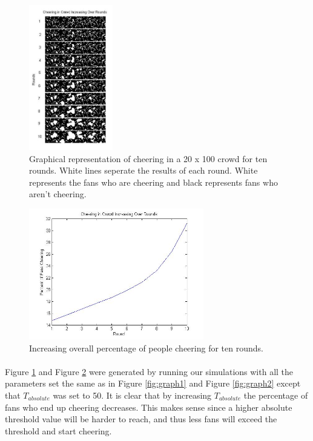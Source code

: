 \documentclass[oneside,12pt]{report}
\begin{document}
\begin{figure}[h]
    \begin{center}
        \includegraphics[height=2.5in]{sample_graph3.jpg}
    \end{center}
    \caption{Graphical representation of cheering in a 20 x 100 crowd for ten rounds. White lines seperate the results of each round. White represents the fans who are cheering and black represents fans who aren't cheering.}
    \label{fig:graph3}
\end{figure}

\begin{figure}[h]
    \begin{center}
        \includegraphics[width=3in]{sample_graph4.jpg}
    \end{center}
    \caption{Increasing overall percentage of people cheering for ten rounds.}
    \label{fig:graph4}
\end{figure}

\paragraph{}
Figure \ref{fig:graph3} and Figure \ref{fig:graph4} were generated by running our simulations with all the parameters set the same as in Figure \ref{fig:graph1} and Figure \ref{fig:graph2} except that $T_{absolute}$ was set to 50. It is clear that by increasing $T_{absolute}$ the percentage of fans who end up cheering decreases. This makes sense since a higher absolute threshold value will be harder to reach, and thus less fans will exceed the threshold and start cheering. 
\end{document}

